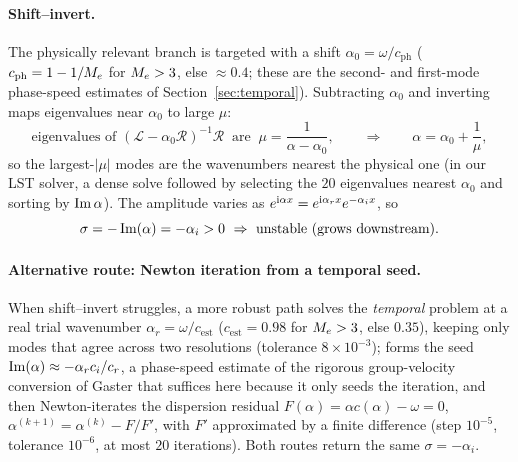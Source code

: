 \documentclass[11pt]{article}
\begin{document}
\paragraph{Shift--invert.} The physically relevant branch is targeted with a shift
$\alpha_0=\omega/c_{\mathrm{ph}}$ ($c_{\mathrm{ph}}=1-1/M_e$ for $M_e>3$, else $\approx0.4$;
these are the second- and first-mode phase-speed estimates of Section~\ref{sec:temporal}). Subtracting
$\alpha_0$ and inverting maps eigenvalues near $\alpha_0$ to large $\mu$:
\begin{equation}\label{eq:shift}
  \text{eigenvalues of }(\mathcal L-\alpha_0\mathcal R)^{-1}\mathcal R\ \text{ are }\ \mu=\frac1{\alpha-\alpha_0},
  \qquad\Rightarrow\qquad \alpha=\alpha_0+\frac1\mu ,
\end{equation}
so the largest-$|\mu|$ modes are the wavenumbers nearest the physical one (in our LST solver, a
dense solve followed by selecting the $20$ eigenvalues nearest $\alpha_0$ and
sorting by $\operatorname{Im}\alpha$). The amplitude varies as
$e^{\mathrm{i}\alpha x}=e^{\mathrm{i}\alpha_rx}e^{-\alpha_ix}$, so
\begin{equation}\label{eq:sgrowth}
  \sigma=-\operatorname{Im}(\alpha)=-\alpha_i>0\ \Rightarrow\ \text{unstable (grows downstream)}.
\end{equation}

\paragraph{Alternative route: Newton iteration from a temporal seed.} When shift--invert struggles, a
more robust path solves the \emph{temporal} problem at a
real trial wavenumber $\alpha_r=\omega/c_{\mathrm{est}}$ ($c_{\mathrm{est}}=0.98$ for $M_e>3$, else
$0.35$), keeping only modes that agree across two resolutions (tolerance $8\times10^{-3}$); forms the
seed $\operatorname{Im}(\alpha)\approx-\alpha_rc_i/c_r$, a phase-speed estimate of the rigorous
group-velocity conversion of Gaster \cite{gaster1962} that suffices here because it only seeds the
iteration, and then Newton-iterates the dispersion residual $F(\alpha)=\alpha c(\alpha)-\omega=0$,
$\alpha^{(k+1)}=\alpha^{(k)}-F/F'$, with $F'$ approximated by a finite difference (step $10^{-5}$,
tolerance $10^{-6}$, at most $20$ iterations). Both routes return the same $\sigma=-\alpha_i$.
\end{document}
